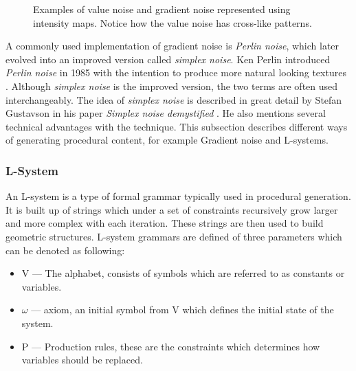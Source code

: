 \begin{figure}[h!]
  \caption{Examples of value noise and gradient noise represented using intensity maps. Notice how the value noise has cross-like patterns.}
  \label{fig:noisetypes}
\end{figure}

A commonly used implementation of gradient noise is \textit{Perlin noise}, which later evolved into an improved version called \textit{simplex noise}.
Ken Perlin introduced \textit{Perlin noise} in 1985 with the intention to produce more natural looking textures \cite{perlin_noise}.
Although \textit{simplex noise} is the improved version, the two terms are often used interchangeably. The idea of \textit{simplex noise} is described in great detail by Stefan Gustavson in his paper \textit{Simplex noise demystified} \cite{simplex_noise}.
He also mentions several technical advantages with the technique.
This subsection describes different ways of generating procedural content, for example Gradient noise and L-systems.

\subsubsection{L-System}
An L-system is a type of formal grammar typically used in procedural generation.
It is built up of strings which under a set of constraints recursively grow larger and more complex with each iteration.
These strings are then used to build geometric structures.
L-system grammars are defined of three parameters which can be denoted as following:

\begin{itemize}
  \item V        --- The alphabet, consists of symbols which are referred to as constants or variables.
  \item $\omega$ --- axiom, an initial symbol from V which defines the initial state of the system.
  \item P        --- Production rules, these are the constraints which determines how variables should be replaced.
\end{itemize}

